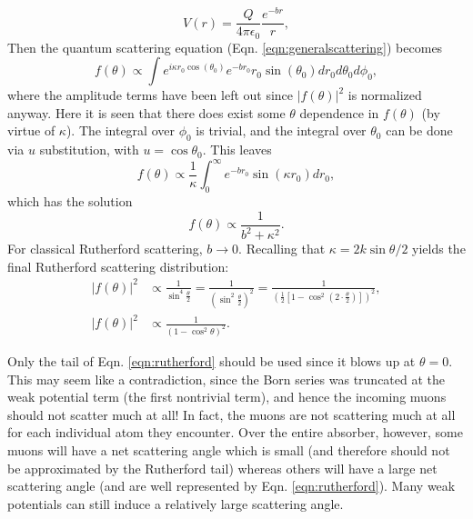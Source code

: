 \begin{equation} \nonumber
V(r)=\frac{Q}{4\pi\epsilon_0}\frac{e^{-br}}{r},
\end{equation}
Then the quantum scattering equation (Eqn. \ref{eqn:generalscattering}) becomes
%
\begin{equation} \nonumber
f(\theta)\propto \int e^{i\kappa r_0\cos(\theta_0)}e^{-br_0}r_0\sin(\theta_0)dr_0 d\theta_0 d\phi_0,
\end{equation}
where the amplitude terms have been left out since $|f(\theta)|^2$ is normalized anyway. Here it is seen that there does exist some $\theta$ dependence in $f(\theta)$ (by virtue of $\kappa$). The integral over $\phi_0$ is trivial, and the integral over $\theta_0$ can be done via $u$ substitution, with $u=\cos\theta_0$. This leaves
\begin{equation} \nonumber
f(\theta)\propto \frac{1}{\kappa}\int_0^\infty e^{-br_0}\sin(\kappa r_0) dr_0,
\end{equation}
%
which has the solution
\begin{equation}\nonumber
f(\theta)\propto\frac{1}{b^2+\kappa^2}.
\end{equation}
For classical Rutherford scattering, $b\rightarrow 0$. Recalling that $\kappa=2k\sin{\theta/2}$ yields the final Rutherford scattering distribution:
\begin{align}
|f(\theta)|^2 &\propto \frac{1}{\sin^4 \frac{\theta}{2}}=\frac{1}{\left(\sin^2 \frac{\theta}{2}\right)^2}=\frac{1}{\left(\frac{1}{2}\left[1-\cos^2\left(2\cdot\frac{\theta}{2}\right)\right]\right)^2},\nonumber \\
|f(\theta)|^2  &\propto\frac{1}{(1-\cos^2{\theta})^2}. \label{eqn:rutherford}
\end{align}

Only the tail of Eqn. \ref{eqn:rutherford} should be used since it blows up at $\theta=0$. This may seem like a contradiction, since the Born series was truncated at the weak potential term (the first nontrivial term), and hence the incoming muons should not scatter much at all! In fact, the muons are not scattering much at all for each individual atom they encounter. Over the entire absorber, however, some muons will have a net scattering angle which is small (and therefore should not be approximated by the Rutherford tail) whereas others will have a large net scattering angle (and are well represented by Eqn. \ref{eqn:rutherford}). Many weak potentials can still induce a relatively large scattering angle.
